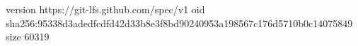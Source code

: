 version https://git-lfs.github.com/spec/v1
oid sha256:95338d3adedfcdfd42d33b8e3f8bd90240953a198567c176d5710b0c14075849
size 60319
